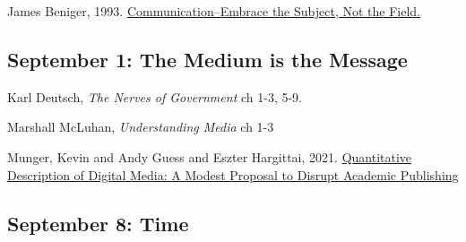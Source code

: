 \vspace{-.1in}\documentclass[11pt]{article}
\begin{document}
\noindent James Beniger, 1993. \href{https://watermark.silverchair.com/jjnlcom0018.pdf?token=AQECAHi208BE49Ooan9kkhW_Ercy7Dm3ZL_9Cf3qfKAc485ysgAAAu4wggLqBgkqhkiG9w0BBwagggLbMIIC1wIBADCCAtAGCSqGSIb3DQEHATAeBglghkgBZQMEAS4wEQQMk0ly7K2yo9IFvzWrAgEQgIICoexEH-sdAXcZ8mg4oY_CBFsCr7a2gHSIxaGEPjEIdNjeRCmzESvJHNQjgEgItfiJ8MUiKGul41rGoPKGB9qXk0MbsrNmuDv00KaSUBY8FWEoBvAh99aUHioOaHvTbQ8LtIrz7sgQ6lA7nE3zoL3kJ3SLq84Vx-hSz6vyQXcy89zOLUjovCcnTDJ8WLmb82r6jKSddcEDMJ5SU6RjH60oQo5H_kyvrECGN5roDRjoWmdSEu6jlPg72NaWEZGxLfe5F4RyNlGjwSzt9NHhciKtjSSKLPsPfL0RAS9e5lw45pnGHdibsGSqnlea6JxQfXWTXlvhNRKxakoMtJolBuDvh5V2JKxxlXJzySnf0MH_IpPRp1dYDXHlLHWHI_aYuI3mosKpeIZHeZN22uWrMg6ZDlOGBPaTTEGj9qfsYrWCbGY9_gstuEemIDpy4hqh0Kw4fEP412jTTrHYdrT38K0GqVzXrWdFLsKcrADsyEjxFFqgOhnsLfTSxkI7avhNSz-w_3rqpz3PnWQy9X5tmC4cqBX_HN7qcOF8dESveMruPfUhDVGz2S_AKRscIQ5GYiQtfHr9I136G7x0lJ2wE7JFkPsVffH7CvyGpHoqP9752tq78ATzgu5xqlgHDJ0bQoITCwQCBJryA5o0unxiBXbByoRkcwLiFNSQKxI81hsYxyRiVYiLEBk02yLkjyfTLIvECFgFIbWl2JE6FMwhXF4AMse6Kfh4hC47ssemNQaX4dJ6iS64YDYrAPb8sE65Kd5Kyd2aE4JFI9Ek1cVnZ4yFXz6TrA61iI_3isM419T81UaUYl-cjNfj_1S6ON8YZAKVM4SWKIxAC0_fD_xzBt7q0fi4AoJ7BvzZz8BWIKPWmgGLtHZr3Red27JOtm7-0tIr6Hs}{Communication--Embrace the Subject, Not the Field.}

\subsection*{September 1: The Medium is the Message}


Karl Deutsch, \textit{The Nerves of Government} ch 1-3, 5-9.

\noindent Marshall McLuhan, \textit{Understanding Media} ch 1-3


\noindent Munger, Kevin and Andy Guess and Eszter Hargittai, 2021. \href{https://journalqd.org/article/view/2713/1825}{Quantitative Description of Digital Media: A Modest Proposal to Disrupt Academic Publishing}


\subsection*{September 8: Time}
\end{document}
